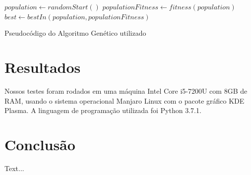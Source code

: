 \documentclass[
	article,			%
	11pt,				%
	oneside,			%
	a4paper,			%
	english,			%
	brazil,				%
	sumario=tradicional
	]{abntex2}
\begin{document}
 \begin{algorithm}
  $population \gets randomStart()$\;
  $populationFitness \gets fitness(population)$\;
  $best \gets bestIn(population, populationFitness)$\;
  \caption{Pseudocódigo do Algoritmo Genético utilizado}
 \end{algorithm}
 

\section{Resultados}

Nossos testes foram rodados em uma máquina Intel Core i5-7200U com 8GB de RAM, usando o sistema operacional Manjaro Linux com o pacote gráfico KDE Plasma. A linguagem de programação utilizada foi Python 3.7.1.

\section{Conclusão}

Text...
% 

\postextual

%

\end{document}
